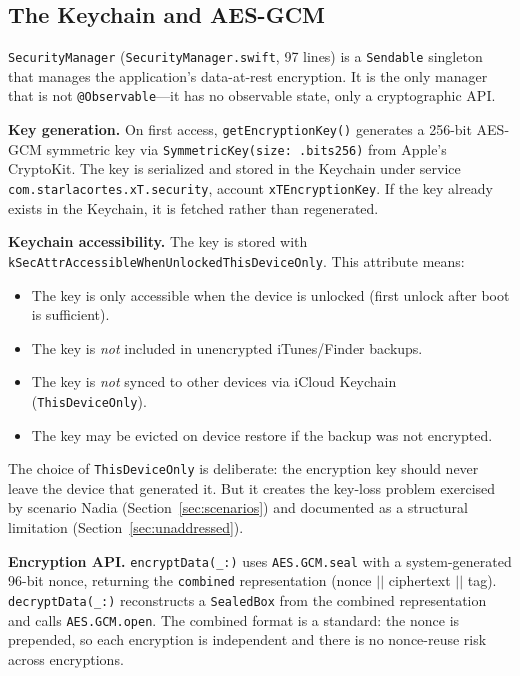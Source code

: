 \documentclass[11pt,a4paper]{article}
\newcommand{\code}[1]{\texttt{\small #1}}
\begin{document}
\subsection{The Keychain and AES-GCM}
\label{sec:keychain}

\code{SecurityManager} (\code{SecurityManager.swift}, 97 lines) is a
\code{Sendable} singleton that manages the application's data-at-rest
encryption. It is the only manager that is not \code{@Observable}---it has
no observable state, only a cryptographic API.

\textbf{Key generation.} On first access, \code{getEncryptionKey()} generates
a 256-bit AES-GCM symmetric key via \code{SymmetricKey(size: .bits256)} from
Apple's CryptoKit. The key is serialized and stored in the Keychain under
service \code{com.starlacortes.xT.security}, account
\code{xTEncryptionKey}. If the key already exists in the Keychain, it is
fetched rather than regenerated.

\textbf{Keychain accessibility.} The key is stored with
\code{kSecAttrAccessibleWhenUnlockedThisDeviceOnly}. This attribute means:
\begin{itemize}[nosep,leftmargin=1.4em]
\item The key is only accessible when the device is unlocked (first
  unlock after boot is sufficient).
\item The key is \emph{not} included in unencrypted iTunes/Finder backups.
\item The key is \emph{not} synced to other devices via iCloud Keychain
  (\code{ThisDeviceOnly}).
\item The key may be evicted on device restore if the backup was not
  encrypted.
\end{itemize}

The choice of \code{ThisDeviceOnly} is deliberate: the encryption key should
never leave the device that generated it. But it creates the key-loss
problem exercised by scenario Nadia (Section~\ref{sec:scenarios}) and
documented as a structural limitation (Section~\ref{sec:unaddressed}).

\textbf{Encryption API.} \code{encryptData(\_:)} uses \code{AES.GCM.seal}
with a system-generated 96-bit nonce, returning the \code{combined}
representation (nonce $||$ ciphertext $||$ tag). \code{decryptData(\_:)}
reconstructs a \code{SealedBox} from the combined representation and calls
\code{AES.GCM.open}. The combined format is a standard: the nonce is
prepended, so each encryption is independent and there is no nonce-reuse
risk across encryptions.
\end{document}
